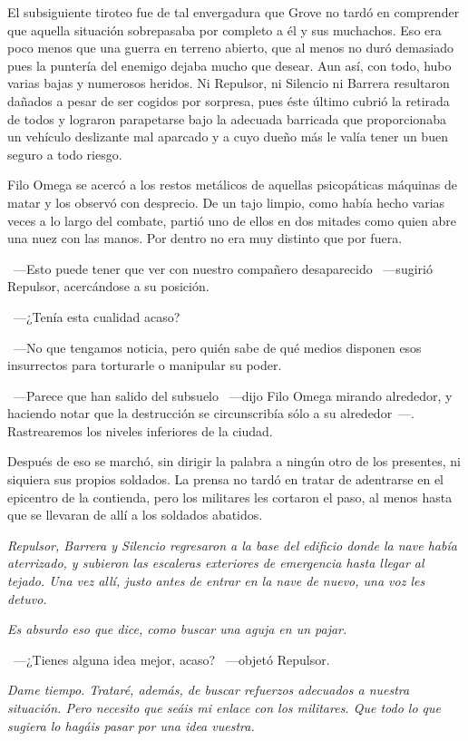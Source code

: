 El subsiguiente tiroteo fue de tal envergadura que Grove no tardó en comprender que aquella situación sobrepasaba por completo a él y sus muchachos. Eso era poco menos que una guerra en terreno abierto, que al menos no duró demasiado pues la puntería del enemigo dejaba mucho que desear. Aun así, con todo, hubo varias bajas y numerosos heridos. Ni Repulsor, ni Silencio ni Barrera resultaron dañados a pesar de ser cogidos por sorpresa, pues éste último cubrió la retirada de todos y lograron parapetarse bajo la adecuada barricada que proporcionaba un vehículo deslizante mal aparcado y a cuyo dueño más le valía tener un buen seguro a todo riesgo.

Filo Omega se acercó a los restos metálicos de aquellas psicopáticas máquinas de matar y los observó con desprecio. De un tajo limpio, como había hecho varias veces a lo largo del combate, partió uno de ellos en dos mitades como quien abre una nuez con las manos. Por dentro no era muy distinto que por fuera.

~---Esto puede tener que ver con nuestro compañero desaparecido ~---sugirió Repulsor, acercándose a su posición.

~---¿Tenía esta cualidad acaso?

~---No que tengamos noticia, pero quién sabe de qué medios disponen esos insurrectos para torturarle o manipular su poder.

~---Parece que han salido del subsuelo ~---dijo Filo Omega mirando alrededor, y haciendo notar que la destrucción se circunscribía sólo a su alrededor~---. Rastrearemos los niveles inferiores de la ciudad.

Después de eso se marchó, sin dirigir la palabra a ningún otro de los presentes, ni siquiera sus propios soldados. La prensa no tardó en tratar de adentrarse en el epicentro de la contienda, pero los militares les cortaron el paso, al menos hasta que se llevaran de allí a los soldados abatidos.

\emph{Repulsor, Barrera y Silencio regresaron a la base del edificio donde la nave había aterrizado, y subieron las escaleras exteriores de emergencia hasta llegar al tejado. Una vez allí, justo antes de entrar en la nave de nuevo, una voz les detuvo.}

\emph{Es absurdo eso que dice, como buscar una aguja en un pajar.}

~---¿Tienes alguna idea mejor, acaso? ~---objetó Repulsor.

\emph{Dame tiempo. Trataré, además, de buscar refuerzos adecuados a nuestra situación. Pero necesito que seáis mi enlace con los militares. Que todo lo que sugiera lo hagáis pasar por una idea vuestra.}

